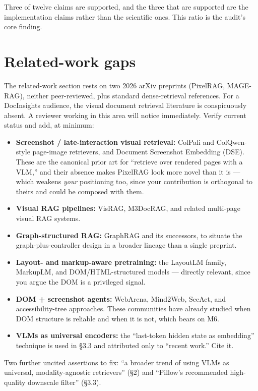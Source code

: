 \documentclass[11pt,a4paper]{article}
\begin{document}
\noindent Three of twelve claims are supported, and the three that are supported are the
implementation claims rather than the scientific ones. This ratio is the audit's core
finding.

\section{Related-work gaps}

The related-work section rests on two 2026 arXiv preprints (PixelRAG, MAGE-RAG), neither
peer-reviewed, plus standard dense-retrieval references. For a DocInsights audience, the
visual document retrieval literature is conspicuously absent. A reviewer working in this
area will notice immediately. Verify current status and add, at minimum:

\begin{itemize}
\item \textbf{Screenshot / late-interaction visual retrieval:} ColPali and ColQwen-style
      page-image retrievers, and Document Screenshot Embedding (DSE). These are the
      canonical prior art for ``retrieve over rendered pages with a VLM,'' and their absence
      makes PixelRAG look more novel than it is --- which weakens \emph{your} positioning
      too, since your contribution is orthogonal to theirs and could be composed with them.
\item \textbf{Visual RAG pipelines:} VisRAG, M3DocRAG, and related multi-page visual RAG systems.
\item \textbf{Graph-structured RAG:} GraphRAG and its successors, to situate the
      graph-plus-controller design in a broader lineage than a single preprint.
\item \textbf{Layout- and markup-aware pretraining:} the LayoutLM family, MarkupLM, and
      DOM/HTML-structured models --- directly relevant, since you argue the DOM is a
      privileged signal.
\item \textbf{DOM + screenshot agents:} WebArena, Mind2Web, SeeAct, and accessibility-tree
      approaches. These communities have already studied when DOM structure is reliable and
      when it is not, which bears on M6.
\item \textbf{VLMs as universal encoders:} the ``last-token hidden state as embedding''
      technique is used in \S3.3 and attributed only to ``recent work.'' Cite it.
\end{itemize}

\noindent Two further uncited assertions to fix: ``a broader trend of using VLMs as
universal, modality-agnostic retrievers'' (\S2) and ``Pillow's recommended high-quality
downscale filter'' (\S3.3).
\end{document}
